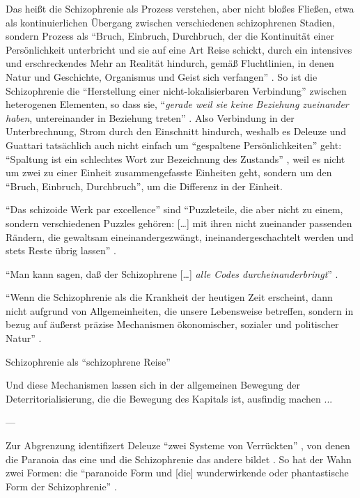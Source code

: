 \documentclass[12pt,
               DIV13,
               paper=a4,
               twoside=false,
               onehalfspacing,
               bibliography=totoc,
               toc=graduated,
               draft,
               ]{scrartcl}
\newcommand{\lips}{\dots\unkern}
\newcommand{\pc}[2]{\parencite[#1]{#2}}
\newcommand{\vgl}[2]{\parencite[vgl.][#1]{#2}}
\newcommand{\worries}[1]{\ifdraft{\textcolor{blue}{\texttt{(#1)}}}{}}
\begin{document}
Das heißt die Schizophrenie als Prozess verstehen, aber nicht bloßes
Fließen, etwa als kontinuierlichen Übergang zwischen verschiedenen
schizophrenen Stadien, sondern Prozess als "`Bruch, Einbruch,
Durchbruch, der die Kontinuität einer Persönlichkeit unterbricht und
sie auf eine Art Reise schickt, durch ein intensives und erschreckendes
\glq Mehr an Realität\grq{} hindurch, gemäß Fluchtlinien, in denen
Natur und Geschichte, Organismus und Geist sich verfangen"'
\pc{28}{schizg}. So ist die Schizophrenie die "`Herstellung einer
nicht-lokalisierbaren Verbindung"' \pc{19}{schizg} zwischen
heterogenen Elementen, so dass sie, "`\emph{gerade weil sie keine
Beziehung zueinander haben}, untereinander in Beziehung treten"'
\pc{19}{schizg}. Also Verbindung in der Unterbrechnung, Strom durch
den Einschnitt hindurch, weshalb es Deleuze und Guattari tatsächlich
auch nicht einfach um "`gespaltene Persönlichkeiten"' geht:
"`Spaltung ist ein schlechtes Wort zur Bezeichnung des Zustands"'
\pc{27}{schizg}, weil es nicht um zwei zu einer Einheit
zusammengefasste Einheiten geht, sondern um den "`Bruch, Einbruch,
Durchbruch"', um die Differenz in der Einheit.

"`Das schizoide Werk par excellence"' \pc{54}{ao} sind "`Puzzleteile,
die aber nicht zu einem, sondern verschiedenen Puzzles gehören:
[\lips] mit ihren nicht zueinander passenden Rändern, die gewaltsam
eineinandergezwängt, ineinandergeschachtelt werden und stets Reste
übrig lassen"' \pc{54}{ao}.

"`Man kann sagen, daß der Schizophrene [\lips] \emph{alle Codes
durcheinanderbringt}"' \pc{22}{ao}. \worries{?}

"`Wenn die Schizophrenie als die Krankheit der heutigen Zeit
erscheint, dann nicht aufgrund von Allgemeinheiten, die unsere
Lebensweise betreffen, sondern in bezug auf äußerst präzise
Mechanismen ökonomischer, sozialer und politischer Natur"' \pc{28}{schizg}.

Schizophrenie als "`schizophrene Reise"' \pc{22}{schizg}

Und diese Mechanismen lassen sich in der allgemeinen Bewegung der
Deterritorialisierung, die die Bewegung des Kapitals ist, ausfindig
machen ...

---

Zur Abgrenzung identifizert Deleuze "`zwei Systeme von Verrückten"'
\pc{12}{zweisys}, von denen die Paranoia das eine und die
Schizophrenie das andere bildet \vgl{S. 14 f.}{zweisys}. So hat der
Wahn \worries{?} zwei Formen: die "`paranoide Form und [die]
wunderwirkende oder phantastische Form der Schizophrenie"' \pc{S. 21
f.}{schizg}.
\end{document}
